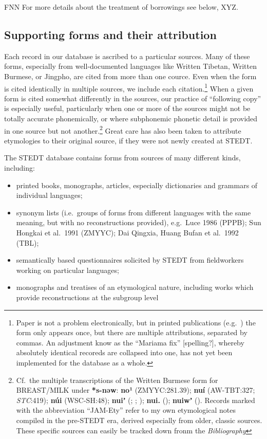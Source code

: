 FNN For more details about the treatment of borrowings see below, XYZ.

\subsection{Supporting forms and their attribution}

Each record in our database is ascribed to a particular sources. Many of these forms, especially from well-documented languages like Written Tibetan, Written Burmese, or Jingpho, are cited from more than one cource. Even when the form is cited identically in multiple sources, we include each citation.\footnote{Paper is not a problem electronically, but in printed publications (e.g.\ \citealt{TBRS}) the form only appears once, but there are  multiple attributions, separated by commas. An adjustment know as the “Mariama fix” [spelling?], whereby absolutely identical recoreds are collapsed into one, has not yet been implemented for the database as a whole.} When a given form is cited somewhat differently in the sources, our practice of “following copy” is especially useful, particularly when one or more of the sources might not be totally accurate phonemically, or where subphonemic phonetic detail is provided in one source but not another.\footnote{Cf.\ the
multiple transcriptions of the Written Burmese form for BREAST/MILK under
\textbf{*s-nəw}:  \textbf{no¹}
(ZMYYC:281.39); \textbf{nuí} (AW-TBT:327; \textit{STC}:419); \textbf{núi}
(WSC-SH:48); \textbf{nuiʼ} (\citealt{JAM-Ety}; \citealt{GEM-CNL}; \citealt{PKB-WBRD});
\textbf{nui.} (\citealt{GEM-CNL}); \textbf{nuiwʼ} (\citealt{GHL-PPB}). Records marked with the abbreviation “JAM-Ety” refer to my own etymological notes compiled in the pre-STEDT era, derived especially from older, classic sources. These specific sources can easily be tracked down fronm the \textit{Bibliography}} Great care has also been taken to attribute etymologies to their original source, if they were not newly created at STEDT.

The STEDT database contains forms from sources of many different kinds,
including:
\begin{itemize}
\item printed books, monographs, articles, especially dictionaries and grammars of
individual languages;
\item synonym lists (i.e.\ groups of forms from different languages with the same
meaning, but with no reconstructions provided), e.g.\ Luce 1986 (PPPB); Sun
Hongkai et al.\ 1991 (ZMYYC); Dai Qingxia, Huang Bufan et al.\ 1992 (TBL);
\item semantically based questionnaires solicited by STEDT from fieldworkers working
on particular languages;
\item monographs and treatises of an etymological nature, including works which
provide reconstructions at the subgroup level
\end{itemize}

